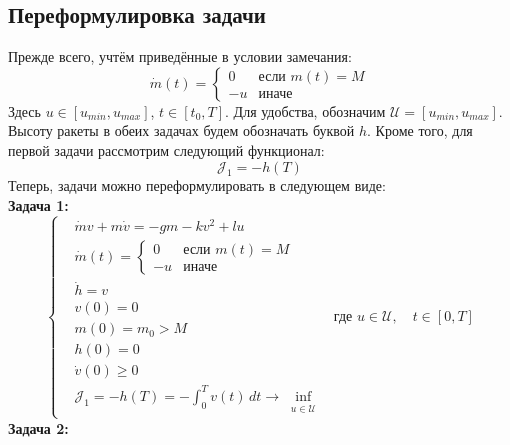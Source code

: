 \documentclass[11pt, oneside, final]{article}
\theoremstyle{break}
\numberwithin{equation}{section}
\theoremstyle{plain}
\theoremstyle{definition}
\begin{document}
    \subsection{Переформулировка задачи}
    \label{sub:new}
    Прежде всего, учтём приведённые в условии замечания:
    \begin{equation}
        \dot m(t) = \begin{cases} 0& \text{если $m(t) = M$} \\ 
                                 -u& \text{иначе}
                     \end{cases}
    \end{equation}
    Здесь \(u \in [u_{min}, u_{max}]\), \(t \in [t_0, T]\).
    Для удобства, обозначим \(\mathcal{U} = [u_{min}, u_{max}] \).
    Высоту ракеты в обеих задачах будем обозначать буквой \(h\).
    Кроме того, для первой задачи рассмотрим следующий функционал:
    \[
        \mathcal{J}_1 = -h(T)
    \]
    Теперь, задачи можно переформулировать в следующем виде: \\
    \textbf{Задача 1:}
    \begin{equation}
        \label{eq:task1}
        \left\{
        \begin{aligned}
            &\dot mv + m \dot v = -gm - kv^2 + lu \\
            &\dot m(t) = \begin{cases} 0& \text{если $m(t) = M$} \\ 
                                 -u& \text{иначе}
                     \end{cases} \\
            &\dot h = v\\
            &v(0) = 0 \\
            &m(0) = m_0 > M \\
            &h(0) = 0 \\
            &\dot v(0) \geqslant 0 \\
            &\mathcal{J}_1 = -h(T) = - \int_0^T{v(t) \, dt} \rightarrow \inf_{\substack{u \in \mathcal{U}}}
        \end{aligned}
        \right.
        \text{ где }u \in \mathcal{U},\quad t \in [0, T]
    \end{equation}
    \textbf{Задача 2:}
\end{document}
